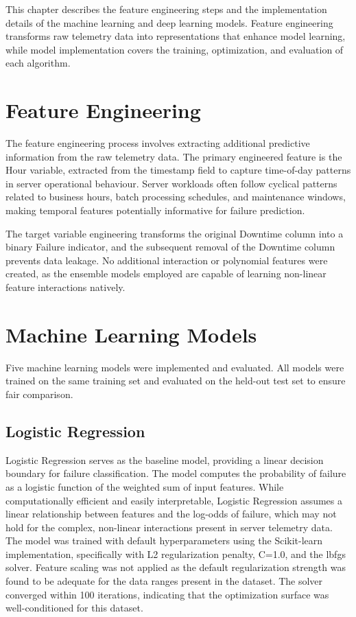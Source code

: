 \documentclass[12pt,letterpaper]{report}
\begin{document}
This chapter describes the feature engineering steps and the implementation details of the machine learning and deep learning models. Feature engineering transforms raw telemetry data into representations that enhance model learning, while model implementation covers the training, optimization, and evaluation of each algorithm.

\section{Feature Engineering}

The feature engineering process involves extracting additional predictive information from the raw telemetry data. The primary engineered feature is the Hour variable, extracted from the timestamp field to capture time-of-day patterns in server operational behaviour. Server workloads often follow cyclical patterns related to business hours, batch processing schedules, and maintenance windows, making temporal features potentially informative for failure prediction.

The target variable engineering transforms the original Downtime column into a binary Failure indicator, and the subsequent removal of the Downtime column prevents data leakage. No additional interaction or polynomial features were created, as the ensemble models employed are capable of learning non-linear feature interactions natively.

\section{Machine Learning Models}

Five machine learning models were implemented and evaluated. All models were trained on the same training set and evaluated on the held-out test set to ensure fair comparison.

\subsection{Logistic Regression}

Logistic Regression serves as the baseline model, providing a linear decision boundary for failure classification. The model computes the probability of failure as a logistic function of the weighted sum of input features. While computationally efficient and easily interpretable, Logistic Regression assumes a linear relationship between features and the log-odds of failure, which may not hold for the complex, non-linear interactions present in server telemetry data. The model was trained with default hyperparameters using the Scikit-learn implementation, specifically with L2 regularization penalty, C=1.0, and the lbfgs solver. Feature scaling was not applied as the default regularization strength was found to be adequate for the data ranges present in the dataset. The solver converged within 100 iterations, indicating that the optimization surface was well-conditioned for this dataset.
\end{document}

